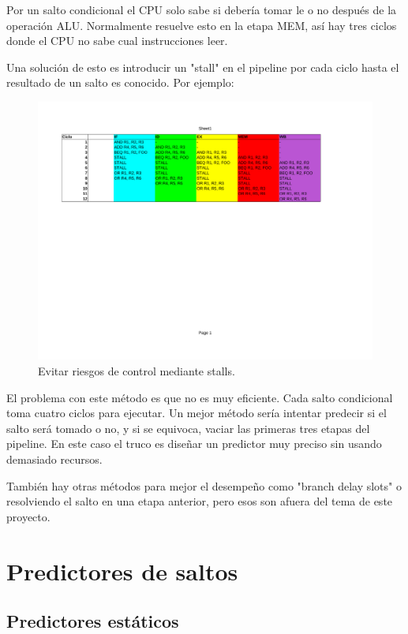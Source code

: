 \documentclass[a4paper]{article}
\begin{document}
Por un salto condicional el CPU solo sabe si debería tomar le o no después de la operación ALU. Normalmente resuelve esto en la etapa MEM, así hay tres ciclos donde el CPU no sabe cual instrucciones leer.

Una solución de esto es introducir un "stall" en el pipeline por cada ciclo hasta el resultado de un salto es conocido. Por ejemplo:

\begin{figure}[!htb]
\centering
\includegraphics[scale=0.4]{./img/always_stall}
\caption{Evitar riesgos de control mediante stalls.}
\label{fig:always_stall}
\end{figure}

El problema con este método es que no es muy eficiente. Cada salto condicional toma cuatro ciclos para ejecutar. Un mejor método sería intentar predecir si el salto será tomado o no, y si se equivoca, vaciar las primeras tres etapas del pipeline. En este caso el truco es diseñar un predictor muy preciso sin usando demasiado recursos.

También hay otras métodos para mejor el desempeño como "branch delay slots" o resolviendo el salto en una etapa anterior, pero esos son afuera del tema de este proyecto.

\section{Predictores de saltos}
\subsection{Predictores estáticos}
\end{document}

